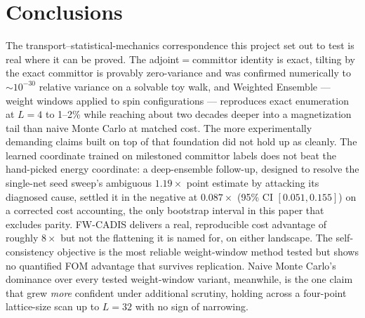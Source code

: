 \documentclass[a4paper,fleqn]{cas-sc}
\begin{document}
	\FloatBarrier
	
	\section{Conclusions}\label{sec:conclusions}
	The transport--statistical-mechanics correspondence this project set out to test is real
	where it can be proved. The adjoint$=$committor identity is exact, tilting by the exact
	committor is provably zero-variance and was confirmed numerically to $\sim\!10^{-30}$
	relative variance on a solvable toy walk, and Weighted Ensemble --- weight windows applied
	to spin configurations --- reproduces exact enumeration at $L=4$ to 1--2\% while reaching
	about two decades deeper into a magnetization tail than naive Monte Carlo at matched cost.
	The more experimentally demanding claims built on top of that foundation did not hold up as
	cleanly. The learned coordinate trained on milestoned committor labels does not beat the
	hand-picked energy coordinate: a deep-ensemble follow-up, designed to resolve the single-net
	seed sweep's ambiguous $1.19\times$ point estimate by attacking its diagnosed cause, settled
	it in the negative at $0.087\times$ (95\% CI $[0.051,0.155]$) on a corrected cost
	accounting, the only bootstrap interval in this paper that excludes parity. FW-CADIS
	delivers a real, reproducible cost advantage of roughly $8\times$ but not the flattening it
	is named for, on either landscape. The self-consistency objective is the most reliable
	weight-window method tested but shows no quantified FOM advantage that survives replication.
	Naive Monte Carlo's dominance over every tested weight-window variant, meanwhile, is the one
	claim that grew \emph{more} confident under additional scrutiny, holding across a four-point
	lattice-size scan up to $L=32$ with no sign of narrowing.
	
\end{document}
